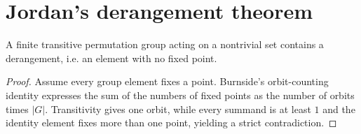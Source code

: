 \section{Jordan's derangement theorem}

\begin{theorem}
\label{thm:jordan-derangement}
\leanok
A finite transitive permutation group acting on a nontrivial set contains a derangement, i.e. an element with no fixed point.
\end{theorem}

\begin{proof}
\leanok
Assume every group element fixes a point. Burnside's orbit-counting identity expresses the sum of the numbers of fixed points as the number of orbits times $|G|$. Transitivity gives one orbit, while every summand is at least $1$ and the identity element fixes more than one point, yielding a strict contradiction.
\end{proof}
